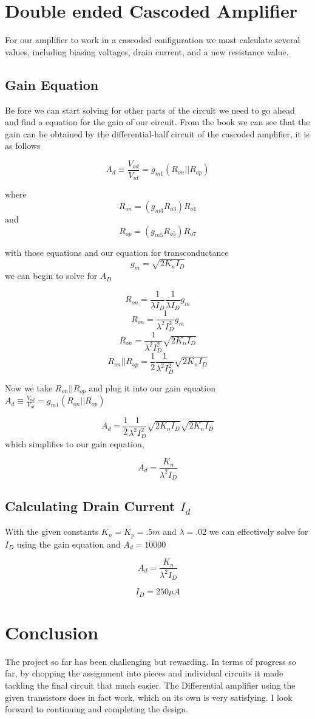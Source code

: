 \documentclass[12pt]{article}
\begin{document}
\section{Double ended Cascoded Amplifier}
For our amplifier to work in a cascoded configuration we must calculate several values, including biasing voltages, drain current, and a new resistance value.
\subsection{Gain Equation}
Be fore we can start solving for other parts of the circuit we need to go ahead and find a equation for the gain of our circuit. From the book we can see that the gain can be obtained by the differential-half circuit of the cascoded amplifier, it is as follows

$$A_d \equiv \frac{V_{od}}{V_{id}} = g_{m1} (R_{on}|| R_{op})$$

where
 $$R_{on} = (g_{m3} R_{o3}) R_{o1}$$ 
and 
$$R_{op} = (g_{m5} R_{o5}) R_{o7}$$

with those equations and our equation for transconductance 
$$g_{m} = \sqrt{2 K_n I_D}$$
 we can begin to solve for $A_D$
 
$$R_{on} =\frac{1}{\lambda I_D} \frac{1}{\lambda I_D} g_m$$
$$R_{on} = \frac{1}{\lambda^2 I_D^2} g_m$$
$$R_{on} = \frac{1}{\lambda^2 I_D^2} \sqrt{2 K_n I_D}$$
$$R_{on}|| R_{op} = \frac{1}{2} \frac{1}{\lambda^2 I_D^2} \sqrt{2 K_n I_D}  $$

Now we take $R_{on}|| R_{op}$ and plug it into our gain equation $A_d \equiv \frac{V_{od}}{V_{id}} = g_{m1} (R_{on}|| R_{op})$


$$A_d = \frac{1}{2} \frac{1}{\lambda^2 I_D^2} \sqrt{2 K_n I_D} \sqrt{2 K_n I_D}$$
 which simplifies to our gain equation,
 
$$A_d  = \frac{K_n}{\lambda^2 I_D}$$
 
\subsection{Calculating Drain Current $I_d$}
With the given constants $K_n = K_p = .5m$ and $\lambda = .02$ we can effectively solve for $I_D$ using the gain equation and $A_d = 10000$

$$A_d  = \frac{K_n}{\lambda^2 I_D}$$
 


$$I_D = 250\mu A$$
 
\section{Conclusion}
The project so far has been challenging but rewarding. In terms of progress so far, by chopping the assignment into pieces and individual circuits it made tackling the final circuit that much easier. The Differential amplifier using the given transistors does in fact work, which on its own is very satisfying. I look forward to continuing and completing the design.
\end{document}
